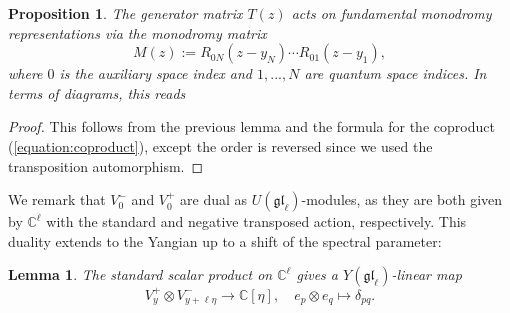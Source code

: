 \documentclass[11pt]{report}
\newtheorem{lemma}[theorem]{Lemma}
\newtheorem{prop}[theorem]{Proposition}
\theoremstyle{definition}
\theoremstyle{remark}
\theoremstyle{remark}
\newcommand{\C}{\mathbb{C}}
\begin{document}
\begin{prop}
The generator matrix $T(z)$ acts on fundamental monodromy representations via the \emph{monodromy matrix}
\begin{equation*}
M(z) := R_{0N}(z-y_N) \cdots R_{01}(z-y_1),
\end{equation*}
where $0$ is the auxiliary space index and $1,...,N$ are quantum space indices. In terms of diagrams, this reads
\begin{center}
\end{center}
\end{prop}

\begin{proof}
This follows from the previous lemma and the formula for the coproduct (\ref{equation:coproduct}), except the order is reversed since we used the transposition automorphism.
\end{proof}

We remark that $V_0^-$ and $V_0^+$ are dual as $U(\mathfrak{gl}_\ell)$-modules, as they are both given by $\C^\ell$ with the standard and negative transposed action, respectively. This duality extends to the Yangian up to a shift of the spectral parameter:

\begin{lemma}
The standard scalar product on $\C^\ell$ gives a $Y(\mathfrak{gl}_\ell)$-linear map
\begin{equation*}
V_y^+ \otimes V_{y+\ell \eta}^- \to \C[\eta], \quad e_p \otimes e_q \mapsto \delta_{pq}.
\end{equation*}
\end{lemma}
\end{document}
